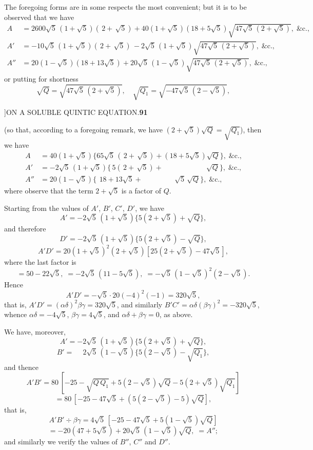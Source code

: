 \documentclass[11pt]{article}
\begin{document}
The foregoing forms are in some respects the most convenient; but it is to be
observed that we have
\[
\begin{aligned}
A &= 2600\sqrt{5}\,(1+\sqrt{5})(\,2+\,\sqrt{5})+40(1+\sqrt{5})(18+5\sqrt{5})\sqrt{47\sqrt{5}\,(2+\sqrt{5})},\;\&\text{c.,}\\
A' &= -10\sqrt{5}\,(1+\sqrt{5})(\,2+\,\sqrt{5})\,-2\sqrt{5}\,(1+\sqrt{5})\sqrt{47\sqrt{5}\,(2+\sqrt{5})},\;\&\text{c.,}\\
A'' &= 20(1-\sqrt{5})(18+13\sqrt{5})+20\sqrt{5}\,(1-\sqrt{5})\sqrt{47\sqrt{5}\,(2+\sqrt{5})},\;\&\text{c.,}
\end{aligned}
\]
or putting for shortness
\[
\sqrt{Q}=\sqrt{47\sqrt{5}\,(2+\sqrt{5})},\quad \sqrt{Q_{1}}=\sqrt{-47\sqrt{5}\,(2-\sqrt{5})},
\]

\newpage
{}]\hfill ON A SOLUBLE QUINTIC EQUATION.\hfill\textbf{91}

\smallskip
(so that, according to a foregoing remark, we have $(2+\sqrt{5})\sqrt{Q}=\sqrt{Q_{1}}$), then we have
\[
\begin{aligned}
A &= 40(1+\sqrt{5})\{65\sqrt{5}\,(\,2+\,\sqrt{5})+(18+5\sqrt{5})\sqrt{Q}\},\;\&\text{c.,}\\
A' &= -2\sqrt{5}\,(1+\sqrt{5})\{\,5(\,2+\,\sqrt{5})+\phantom{(18+5\sqrt{5})}\sqrt{Q}\},\;\&\text{c.,}\\
A'' &= 20(1-\sqrt{5})\{\phantom{(}18+13\sqrt{5}+\phantom{(18+5)}\sqrt{5}\,\sqrt{Q}\},\;\&\text{c.,}
\end{aligned}
\]
where observe that the term $2+\sqrt{5}$ is a factor of $Q$.

\hspace{1em} Starting from the values of $A'$, $B'$, $C'$, $D'$, we have
\[
A'=-2\sqrt{5}\,(1+\sqrt{5})\{5(2+\sqrt{5})+\sqrt{Q}\},
\]
and therefore
\[
D'=-2\sqrt{5}\,(1+\sqrt{5})\{5(2+\sqrt{5})-\sqrt{Q}\},
\]
\[
A'D'=20(1+\sqrt{5})^{2}(2+\sqrt{5})[25(2+\sqrt{5})-47\sqrt{5}],
\]
where the last factor is
\[
=50-22\sqrt{5},\;=-2\sqrt{5}\,(11-5\sqrt{5}),\;=-\sqrt{5}\,(1-\sqrt{5})^{2}(2-\sqrt{5}).
\]
Hence
\[
A'D'=-\sqrt{5}\cdot 20(-4)^{2}(-1)=320\sqrt{5},
\]
that is, $A'D'=(\alpha\delta)^{2}\beta\gamma=320\sqrt{5}$, and similarly
$B'C'=\alpha\delta(\beta\gamma)^{2}=-320\sqrt{5}$,
whence $\alpha\delta=-4\sqrt{5}$, $\beta\gamma=4\sqrt{5}$, and
$\alpha\delta+\beta\gamma=0$, as above.

\hspace{1em} We have, moreover,
\[
A'=-2\sqrt{5}\,(1+\sqrt{5})\{5(2+\sqrt{5})+\sqrt{Q}\},
\]
\[
B'=\phantom{-}2\sqrt{5}\,(1-\sqrt{5})\{5(2-\sqrt{5})-\sqrt{Q_{1}}\},
\]
and thence
\[
A'B'=80\,[-25-\sqrt{Q\,Q_{1}}+5(2-\sqrt{5})\sqrt{Q}-5(2+\sqrt{5})\sqrt{Q_{1}}]
\]
\[
=80\,[-25-47\sqrt{5}+(5(2-\sqrt{5})-5)\sqrt{Q}],
\]
that is,
\[
A'B'\div\beta\gamma=4\sqrt{5}\,[-25-47\sqrt{5}+5(1-\sqrt{5})\sqrt{Q}]
\]
\[
=-20(47+5\sqrt{5})+20\sqrt{5}\,(1-\sqrt{5})\sqrt{Q},\;=A'';
\]
and similarly we verify the values of $B''$, $C''$ and $D''$.
\end{document}

